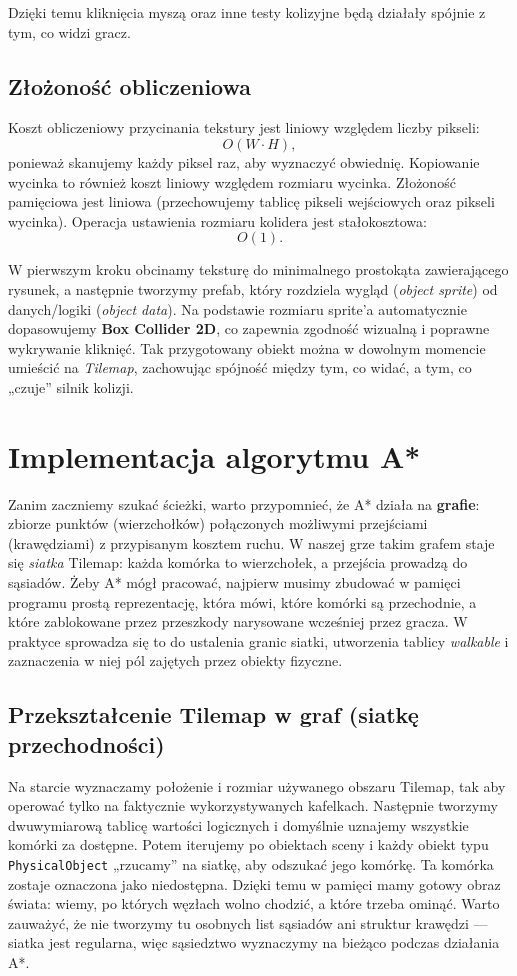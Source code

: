\documentclass[a4paper,12pt]{book} %
\begin{document}
Dzięki temu kliknięcia myszą oraz inne testy kolizyjne będą działały spójnie z tym, co widzi gracz.

\subsection*{Złożoność obliczeniowa}

Koszt obliczeniowy przycinania tekstury jest liniowy względem liczby pikseli:
\[
O(W \cdot H),
\]
ponieważ skanujemy każdy piksel raz, aby wyznaczyć obwiednię. Kopiowanie wycinka to również koszt liniowy względem rozmiaru wycinka. Złożoność pamięciowa jest liniowa (przechowujemy tablicę pikseli wejściowych oraz pikseli wycinka). Operacja ustawienia rozmiaru kolidera jest stałokosztowa:
\[
O(1).
\]

W pierwszym kroku obcinamy teksturę do minimalnego prostokąta zawierającego rysunek, a następnie tworzymy prefab, który rozdziela wygląd (\emph{object sprite}) od danych/logiki (\emph{object data}). Na podstawie rozmiaru sprite’a automatycznie dopasowujemy \textbf{Box Collider 2D}, co zapewnia zgodność wizualną i poprawne wykrywanie kliknięć. Tak przygotowany obiekt można w dowolnym momencie umieścić na \emph{Tilemap}, zachowując spójność między tym, co widać, a tym, co „czuje” silnik kolizji.

\section{Implementacja algorytmu A*}

Zanim zaczniemy szukać ścieżki, warto przypomnieć, że A* działa na \textbf{grafie}: zbiorze punktów (wierzchołków) połączonych możliwymi przejściami (krawędziami) z przypisanym kosztem ruchu. W naszej grze takim grafem staje się \emph{siatka} Tilemap: każda komórka to wierzchołek, a przejścia prowadzą do sąsiadów. Żeby A* mógł pracować, najpierw musimy zbudować w pamięci programu prostą reprezentację, która mówi, które komórki są przechodnie, a które zablokowane przez przeszkody narysowane wcześniej przez gracza. W praktyce sprowadza się to do ustalenia granic siatki, utworzenia tablicy \emph{walkable} i zaznaczenia w niej pól zajętych przez obiekty fizyczne.

\subsection{Przekształcenie Tilemap w graf (siatkę przechodności)}

Na starcie wyznaczamy położenie i rozmiar używanego obszaru Tilemap, tak aby operować tylko na faktycznie wykorzystywanych kafelkach. Następnie tworzymy dwuwymiarową tablicę wartości logicznych i domyślnie uznajemy wszystkie komórki za dostępne. Potem iterujemy po obiektach sceny i każdy obiekt typu \texttt{PhysicalObject} „rzucamy” na siatkę, aby odszukać jego komórkę. Ta komórka zostaje oznaczona jako niedostępna. Dzięki temu w pamięci mamy gotowy obraz świata: wiemy, po których węzłach wolno chodzić, a które trzeba ominąć. Warto zauważyć, że nie tworzymy tu osobnych list sąsiadów ani struktur krawędzi --- siatka jest regularna, więc sąsiedztwo wyznaczymy na bieżąco podczas działania A*.
\end{document}
